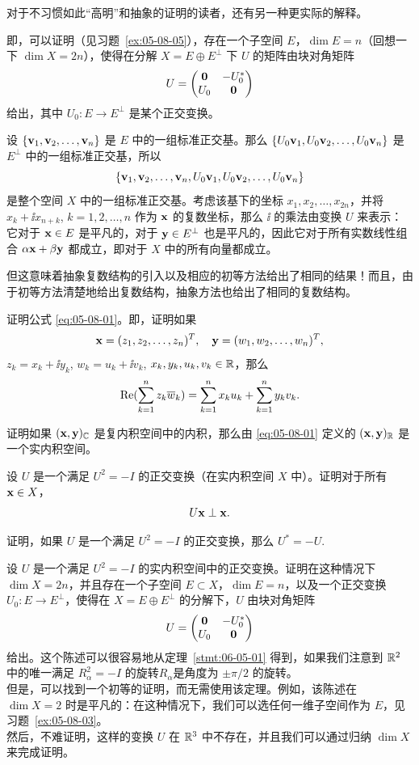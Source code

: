 对于不习惯如此“高明”和抽象的证明的读者，还有另一种更实际的解释。

即，可以证明（见习题~\ref{ex:05-08-05}），存在一个子空间 $E$，$\dim E = n$（回想一下 $\dim X = 2n$），使得在分解 $X = E \oplus E^\perp$ 下 $U$ 的矩阵由块对角矩阵
$$U = \begin{pmatrix} \mathbf{0} & -U_0^* \\ U_0 & \mathbf{0} \end{pmatrix}$$
给出，其中 $U_0: E \to E^\perp$ 是某个正交变换。

设 $\{\mathbf{v}_1, \mathbf{v}_2, \dots, \mathbf{v}_n\}$ 是 $E$ 中的一组标准正交基。那么 $\{U_0 \mathbf{v}_1, U_0 \mathbf{v}_2, \dots, U_0 \mathbf{v}_n\}$ 是 $E^\perp$ 中的一组标准正交基，所以
$$\{\mathbf{v}_1, \mathbf{v}_2, \dots, \mathbf{v}_n, U_0 \mathbf{v}_1, U_0 \mathbf{v}_2, \dots, U_0 \mathbf{v}_n\}$$
是整个空间 $X$ 中的一组标准正交基。考虑该基下的坐标 $x_1, x_2, \dots, x_{2n}$，并将 $x_k + \ii x_{n+k}$, $k=1, 2, \dots, n$ 作为 $\mathbf{x}$ 的复数坐标，那么 $\ii$ 的乘法由变换 $U$ 来表示：它对于 $\mathbf{x} \in E$ 是平凡的，对于 $\mathbf{y} \in E^\perp$ 也是平凡的，因此它对于所有实数线性组合 $\alpha \mathbf{x} + \beta \mathbf{y}$ 都成立，即对于 $X$ 中的所有向量都成立。

但这意味着抽象复数结构的引入以及相应的初等方法给出了相同的结果！而且，由于初等方法清楚地给出复数结构，抽象方法也给出了相同的复数结构。

\begin{problemset}
\item \label{ex:05-08-01} 证明公式 \eqref{eq:05-08-01}。即，证明如果
$$\mathbf{x} = (z_1, z_2, \dots, z_n)^T, \quad \mathbf{y} = (w_1, w_2, \dots, w_n)^T,$$
$z_k = x_k + \ii y_k$, $w_k = u_k + \ii v_k$, $x_k, y_k, u_k, v_k \in \mathbb{R}$，那么
$$\operatorname{Re}(\sum_{k=1}^n z_k \overline{w}_k) = \sum_{k=1}^n x_k u_k + \sum_{k=1}^n y_k v_k.$$
\item \label{ex:05-08-02} 证明如果 $(\mathbf{x}, \mathbf{y})_{\mathbb{C}}$ 是复内积空间中的内积，那么由 \eqref{eq:05-08-01} 定义的 $(\mathbf{x}, \mathbf{y})_{\mathbb{R}}$ 是一个实内积空间。
\item \label{ex:05-08-03} 设 $U$ 是一个满足 $U^2 = -I$ 的正交变换（在实内积空间 $X$ 中）。证明对于所有 $\mathbf{x} \in X$，
$$U\mathbf{x} \perp \mathbf{x}.$$
\item \label{ex:05-08-04} 证明，如果 $U$ 是一个满足 $U^2 = -I$ 的正交变换，那么 $U^* = -U$.~
\item \label{ex:05-08-05} 设 $U$ 是一个满足 $U^2 = -I$ 的实内积空间中的正交变换。证明在这种情况下 $\dim X = 2n$，并且存在一个子空间 $E \subset X$，$\dim E = n$，以及一个正交变换 $U_0: E \to E^\perp$，使得在 $X = E \oplus E^\perp$ 的分解下，$U$ 由块对角矩阵
$$U = \begin{pmatrix} \mathbf{0} & -U_0^* \\ U_0 & \mathbf{0} \end{pmatrix}$$
给出。这个陈述可以很容易地从定理~\ref{stmt:06-05-01} 得到，如果我们注意到 $\mathbb{R}^2$ 中的唯一满足 $R_\alpha^2 = -I$ 的旋转$R_\alpha$是角度为 $\pm \pi/2$ 的旋转。\\
但是，可以找到一个初等的证明，而无需使用该定理。例如，该陈述在 $\dim X = 2$ 时是平凡的：在这种情况下，我们可以选任何一维子空间作为 $E$，见习题~\ref{ex:05-08-03}。\\
然后，不难证明，这样的变换 $U$ 在 $\mathbb{R}^3$ 中不存在，并且我们可以通过归纳 $\dim X$ 来完成证明。
\end{problemset}




